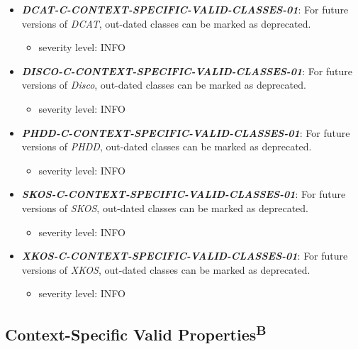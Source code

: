 \documentclass{llncs}
\begin{document}
\begin{itemize}
	\item \textbf{{\em DCAT-C-CONTEXT-SPECIFIC-VALID-CLASSES-01}}: For future versions of \emph{DCAT}, out-dated classes can be marked as deprecated.
	\begin{itemize}
		\item severity level: INFO
	\end{itemize}
\end{itemize}

\begin{itemize}
	\item \textbf{{\em DISCO-C-CONTEXT-SPECIFIC-VALID-CLASSES-01}}: For future versions of \emph{Disco}, out-dated classes can be marked as deprecated.
	\begin{itemize}
		\item severity level: INFO
	\end{itemize}
\end{itemize}

\begin{itemize}
	\item \textbf{{\em PHDD-C-CONTEXT-SPECIFIC-VALID-CLASSES-01}}: For future versions of \emph{PHDD}, out-dated classes can be marked as deprecated.
	\begin{itemize}
		\item severity level: INFO
	\end{itemize}
\end{itemize}

\begin{itemize}
	\item \textbf{{\em SKOS-C-CONTEXT-SPECIFIC-VALID-CLASSES-01}}: For future versions of \emph{SKOS}, out-dated classes can be marked as deprecated.
	\begin{itemize}
		\item severity level: INFO
	\end{itemize}
\end{itemize}

\begin{itemize}
	\item \textbf{{\em XKOS-C-CONTEXT-SPECIFIC-VALID-CLASSES-01}}: For future versions of \emph{XKOS}, out-dated classes can be marked as deprecated.
	\begin{itemize}
		\item severity level: INFO
	\end{itemize}
\end{itemize}

\subsection{Context-Specific Valid Properties\textsuperscript{B}}
\end{document}
